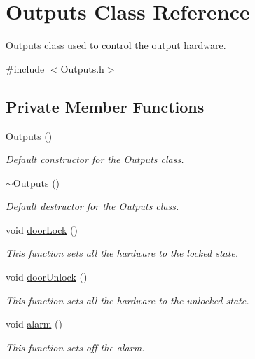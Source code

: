 \hypertarget{classOutputs}{}\section{Outputs Class Reference}
\label{classOutputs}


\hyperlink{classOutputs}{Outputs} class used to control the output hardware.  




{\ttfamily \#include $<$Outputs.\+h$>$}

\subsection*{Private Member Functions}
\begin{DoxyCompactItemize}
\item 
\hyperlink{classOutputs_a86768c5f5c0ce6ab00c4bac00f3b5e63}{Outputs} ()
\begin{DoxyCompactList}\small\item\em Default constructor for the \hyperlink{classOutputs}{Outputs} class. \end{DoxyCompactList}\item 
\hyperlink{classOutputs_a77531126d059e84abe973ded897f6cf1}{$\sim$\+Outputs} ()
\begin{DoxyCompactList}\small\item\em Default destructor for the \hyperlink{classOutputs}{Outputs} class. \end{DoxyCompactList}\item 
void \hyperlink{classOutputs_a7f65875e7cbaf23acdd6c003726505fd}{door\+Lock} ()
\begin{DoxyCompactList}\small\item\em This function sets all the hardware to the locked state. \end{DoxyCompactList}\item 
void \hyperlink{classOutputs_ad29c1e1eda4267feb3ffa7c41a5190c5}{door\+Unlock} ()
\begin{DoxyCompactList}\small\item\em This function sets all the hardware to the unlocked state. \end{DoxyCompactList}\item 
void \hyperlink{classOutputs_a610431c941db0b5c750f55ae47ce1783}{alarm} ()
\begin{DoxyCompactList}\small\item\em This function sets off the alarm. \end{DoxyCompactList}\end{DoxyCompactItemize}
